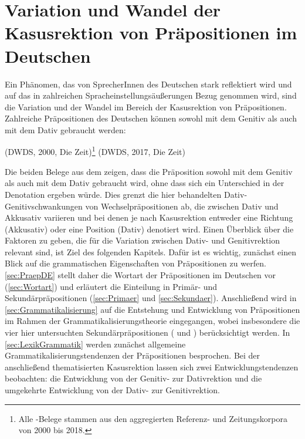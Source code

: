 \chapter{Variation und Wandel der Kasusrektion von Präpositionen im Deutschen} \label{cha:SekPraeps}
Ein Phänomen, das von SprecherInnen des Deutschen stark reflektiert wird und auf das in zahlreichen Spracheinstellungsäußerungen Bezug genommen wird, sind die Variation und der Wandel im Bereich der Kasusrektion von Präpositionen. 
Zahlreiche Präpositionen des Deutschen können sowohl mit dem Genitiv als auch mit dem Dativ gebraucht werden: 
\begin{exe}
\ex {} (DWDS, 2000, Die Zeit)\footnote{Alle \citeauthor{DWDS}-Belege stammen aus den aggregierten Referenz- und Zeitungskorpora von 2000 bis 2018.}
\ex {} (DWDS, 2017, Die Zeit)
\end{exe}
Die beiden Belege aus dem \citeauthor{DWDS} zeigen, dass die Präposition \waehrend{} sowohl mit dem Genitiv als auch mit dem Dativ gebraucht wird, ohne dass sich ein Unterschied in der Denotation ergeben würde. 
Dies grenzt die hier behandelten Dativ-Genitivschwankungen von Wechselpräpositionen ab, die zwischen Dativ und Akkusativ variieren und bei denen je nach Kasusrektion entweder eine Richtung (Akkusativ) oder eine Position (Dativ) denotiert wird.  
Einen Überblick über die Faktoren zu geben, die für die Variation zwischen Dativ- und Genitivrektion relevant sind, ist Ziel des folgenden Kapitels. 
Dafür ist es wichtig, zunächst einen Blick auf die grammatischen Eigenschaften von Präpositionen zu werfen. 
\autoref{sec:PraepDE} stellt daher die Wortart der Präpositionen im Deutschen vor (\autoref{sec:Wortart}) und erläutert die Einteilung in Primär- und Sekundärpräpositionen (\ref{sec:Primaer} und \autoref{sec:Sekundaer}). 
Anschließend wird in \autoref{sec:Grammatikalisierung} auf die Entstehung und Entwicklung von Präpositionen im Rahmen der Grammatikalisierungstheorie eingegangen, wobei insbesondere die vier hier untersuchten Sekundärpräpositionen ( und ) berücksichtigt werden. 
In \autoref{sec:LexikGrammatik} werden zunächst allgemeine Grammatikalisierungstendenzen der Präpositionen besprochen. 
Bei der anschließend thematisierten Kasusrektion lassen sich zwei Entwicklungstendenzen beobachten: die Entwicklung von der Genitiv- zur Dativrektion und die umgekehrte Entwicklung von der Dativ- zur Genitivrektion. 
